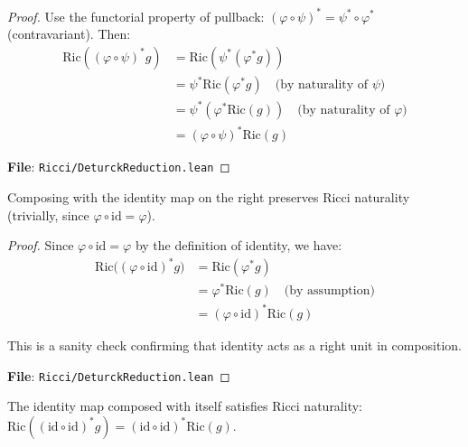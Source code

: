 \begin{proof}
\leanok
{}
Use the functorial property of pullback: $(\varphi \circ \psi)^* = \psi^* \circ \varphi^*$ (contravariant).
Then:
\begin{align*}
\mathrm{Ric}((\varphi \circ \psi)^* g) &= \mathrm{Ric}(\psi^* (\varphi^* g)) \\
&= \psi^* \mathrm{Ric}(\varphi^* g) \quad \text{(by naturality of $\psi$)} \\
&= \psi^* (\varphi^* \mathrm{Ric}(g)) \quad \text{(by naturality of $\varphi$)} \\
&= (\varphi \circ \psi)^* \mathrm{Ric}(g)
\end{align*}

\textbf{File}: \texttt{Ricci/DeturckReduction.lean}
\end{proof}

\begin{lemma}
\label{lem:ricciNaturalityOn_comp_id}
\leanok
{}
Composing with the identity map on the right preserves Ricci naturality (trivially, since $\varphi \circ \mathrm{id} = \varphi$).
\end{lemma}

\begin{proof}
\leanok
{}
Since $\varphi \circ \mathrm{id} = \varphi$ by the definition of identity, we have:
\begin{align*}
\mathrm{Ric}\big((\varphi \circ \mathrm{id})^* g\big)
&= \mathrm{Ric}(\varphi^* g) \\
&= \varphi^* \mathrm{Ric}(g) \quad \text{(by assumption)} \\
&= (\varphi \circ \mathrm{id})^* \mathrm{Ric}(g)
\end{align*}

This is a sanity check confirming that identity acts as a right unit in composition.

\textbf{File}: \texttt{Ricci/DeturckReduction.lean}
\end{proof}

\begin{lemma}
\label{lem:ricciNaturalityOn_id_id}
\leanok
{}
The identity map composed with itself satisfies Ricci naturality: $\mathrm{Ric}((\mathrm{id} \circ \mathrm{id})^* g) = (\mathrm{id} \circ \mathrm{id})^* \mathrm{Ric}(g)$.
\end{lemma}

